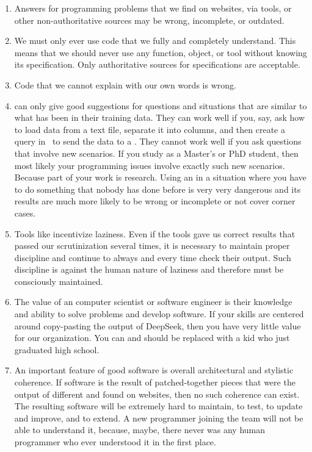 \begin{enumerate}%
%
\item Answers for programming problems that we find on websites, via  tools, or other non-authoritative sources may be wrong, incomplete, or outdated.%
%
\item We must only ever use code that we fully and completely understand. %
This means that we should never use any function, object, or tool without knowing its specification. %
Only authoritative sources for specifications are acceptable.%
%
\item Code that we cannot explain with our own words is wrong.%
%
\item {} can only give good suggestions for questions and situations that are similar to what has been in their training data. %
They can work well if you, say, ask how to load data from a text file, separate it into columns, and then create a  query in \sql\ to send the data to a \dbms. %
They cannot work well if you ask questions that involve new scenarios. %
If you study as a Master's or PhD student, then most likely your programming issues involve exactly such new scenarios. %
Because part of your work is research. %
Using an  in a situation where you have to do something that nobody has done before is very very dangerous and its results are much more likely to be wrong or incomplete or not cover corner cases.%
%
\item Tools like  incentivize laziness. %
Even if the tools gave us correct results that passed our scrutinization several times, it is necessary to maintain proper discipline and continue to always and every time check their output. %
Such discipline is against the human nature of laziness and therefore must be consciously maintained.%
%
\item The value of an computer scientist or software engineer is their knowledge and ability to solve problems and develop software. %
If your skills are centered around copy-pasting the output of DeepSeek, then you have very little value for our organization. %
You can and should be replaced with a kid who just graduated high school.%
%
\item An important feature of good software is overall architectural and stylistic coherence. %
If software is the result of patched-together pieces that were the output of different  and found on websites, then no such coherence can exist. %
The resulting software will be extremely hard to maintain, to test, to update and improve, and to extend. %
A new programmer joining the team will not be able to understand it, because, maybe, there never was any human programmer who ever understood it in the first place.%
%
\end{enumerate}%
